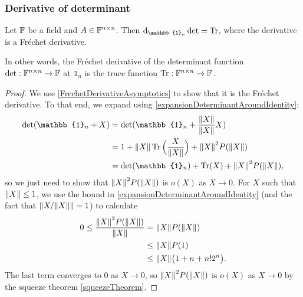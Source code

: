 \subsubsection{Derivative of determinant}
\begin{proposition} \label{DerivativeDeterminantAtIdentity}
Let $\mathbb{F}$ be a field and $A\in \mathbb{F}^{n\times n}$. Then $\diff{_{\mathbb{1}_n}\det} = \Tr$, where the derivative is a Fréchet derivative.
\end{proposition}
In other words, the Fréchet derivative of the determinant function $\det: \mathbb{F}^{n\times n}\to \mathbb{F}$ at $\mathbb{1}_{n}$ is the trace function $\operatorname{Tr}:\mathbb{F}^{n\times n}\to \mathbb{F}$.
\begin{proof}
We use \ref{FrechetDerivativeAsymptotics} to show that it is the Fréchet derivative. To that end, we expand using \ref{expansionDeterminantAroundIdentity}:
\begin{align*}
\det(\mathbb{1}_n + X) &= \det(\mathbb{1}_n + \frac{\norm{X}}{\norm{X}}X) \\
&= 1 + \norm{X}\Tr\Big(\frac{X}{\norm{X}}\Big) + {\norm{X}}^2 P({\norm{X}}) \\
&= \det(\mathbb{1}_n) + \Tr(X) + {\norm{X}}^2 P({\norm{X}}),
\end{align*}
so we just need to show that ${\lVert X\rVert}^2 P({\lVert X\rVert})$ is $o(X)$ as $X\to 0$. For $X$ such that $\lVert X\rVert \leq 1$, we use the bound in \ref{expansionDeterminantAroundIdentity} (and the fact that $\lVert X/\lVert X\rVert\rVert = 1$) to calculate
\begin{align*}
0\leq \frac{{\lVert X\rVert}^2 P({\lVert X\rVert})}{\lVert X\rVert} &= {\lVert X\rVert} P({\lVert X\rVert}) \\
&\leq {\lVert X\rVert} P(1) \\
&\leq \lVert X\rVert\big(1 + n + n!2^n\big).
\end{align*}
The last term converges to $0$ as $X\to 0$, so ${\lVert X\rVert}^2 P({\lVert X\rVert})$ is $o(X)$ as $X\to 0$ by the squeeze theorem \ref{squeezeTheorem}.
\end{proof}

